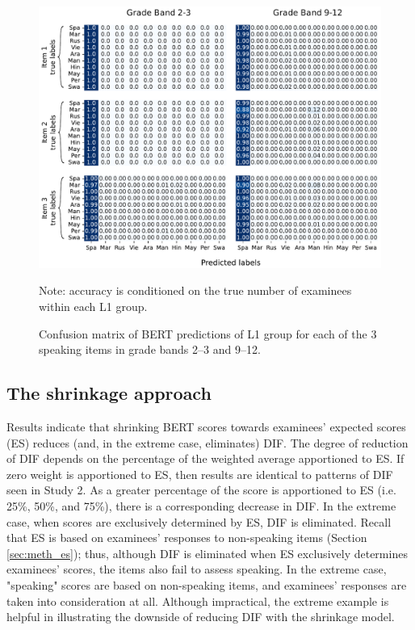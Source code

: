 \documentclass [PhD] {uclathes}
\begin{document}
\begin{figure}[h]
    \centering
    \caption{Confusion matrix of BERT predictions of L1 group for each of the 3 speaking items in grade bands 2–3 and 9–12.}    
    \includegraphics[width=6.5in]{figures/20230516_language805_heatmap_edit.pdf}
    \label{heatmap_lang}
	{\newline Note: accuracy is conditioned on the true number of examinees within each L1 group. \par}
\end{figure}

\subsection{The shrinkage approach}

Results indicate that shrinking BERT scores towards examinees’ expected scores (ES) reduces (and, in the extreme case, eliminates) DIF. The degree of reduction of DIF depends on the percentage of the weighted average apportioned to ES. If zero weight is apportioned to ES, then results are identical to patterns of DIF seen in Study 2. As a greater percentage of the score is apportioned to ES (i.e. 25\%, 50\%, and 75\%), there is a corresponding decrease in DIF. In the extreme case, when scores are exclusively determined by ES, DIF is eliminated. Recall that ES is based on examinees’ responses to non-speaking items (Section \ref{sec:meth_es}); thus, although DIF is eliminated when ES exclusively determines examinees’ scores, the items also fail to assess speaking. In the extreme case, "speaking" scores are based on non-speaking items, and examinees’ responses are taken into consideration at all. Although impractical, the extreme example is helpful in illustrating the downside of reducing DIF with the shrinkage model. 
\end{document}
